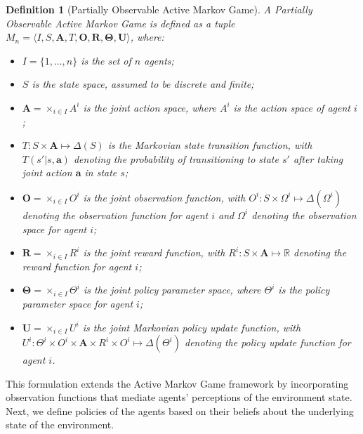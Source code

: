 \documentclass[a4paper,12pt]{report}
\newtheorem{definition}{Definition}
\begin{document}
\begin{definition}[Partially Observable Active Markov Game]
    A Partially Observable Active Markov Game is defined as a tuple $M_n = \langle I, S, \boldsymbol{A}, T, \boldsymbol{O}, \boldsymbol{R}, \boldsymbol{\Theta}, \boldsymbol{U} \rangle$, where:
    \begin{itemize}
        \item $I = \{1, \ldots, n\}$ is the set of $n$ agents;
        \item $S$ is the state space, assumed to be discrete and finite;
        \item $\boldsymbol{A} = \times_{i \in I} A^i$ is the joint action space, where $A^i$ is the action space of agent $i$;
        \item $T: S \times \boldsymbol{A} \mapsto \Delta(S)$ is the Markovian state transition function, with $T(s'|s, \boldsymbol{a})$ denoting the probability of transitioning to state $s'$ after taking joint action $\boldsymbol{a}$ in state $s$;
        \item $\boldsymbol{O} = \times_{i \in I} O^i$ is the joint observation function, with $O^i: S \times \Omega^i \mapsto \Delta(\Omega^i)$ denoting the observation function for agent $i$ and $\Omega^i$ denoting the observation space for agent $i$;
        \item $\boldsymbol{R} = \times_{i \in I} R^i$ is the joint reward function, with $R^i: S \times \boldsymbol{A} \mapsto \mathbb{R}$ denoting the reward function for agent $i$;
        \item $\boldsymbol{\Theta} = \times_{i \in I} \Theta^i$ is the joint policy parameter space, where $\Theta^i$ is the policy parameter space for agent $i$;
        \item $\boldsymbol{U} = \times_{i \in I} U^i$ is the joint Markovian policy update function, with
              $U^i: \Theta^i \times O^i \times \boldsymbol{A} \times R^i \times O^i \mapsto \Delta(\Theta^i)$ denoting the policy update function for agent $i$.
    \end{itemize}
\end{definition}
This formulation extends the Active Markov Game framework by incorporating observation functions that mediate agents' perceptions of the environment state. Next, we define policies of the agents based on their beliefs about the underlying state of the environment.
\end{document}

